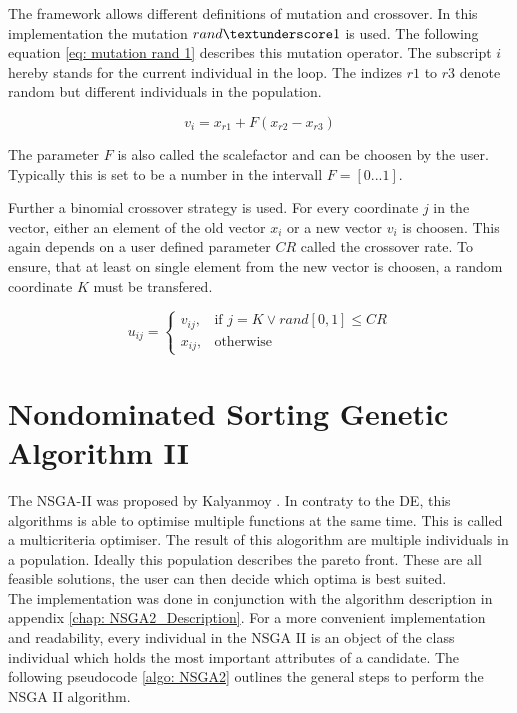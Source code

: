 \documentclass[./\jobname.tex]{subfiles}
\begin{document}
The framework allows different definitions of mutation and crossover. In this implementation the mutation $rand\textunderscore1$ is used. The following equation \ref{eq: mutation rand 1} describes this mutation operator. The subscript $i$ hereby stands for the current individual in the loop. The indizes $r1$ to $r3$ denote random but different individuals in the population. 

\begin{equation}
\label{eq: mutation rand 1}
v_i = x_{r1} + F (x_{r2} - x_{r3})
\end{equation}

The parameter $F$ is also called the scalefactor and can be choosen by the user. Typically this is set to be a number in the intervall $F = \left[ 0 ... 1 \right] $.

Further a binomial crossover strategy is used. For every coordinate $j$ in the vector, either an element of the old vector $x_i$ or a new vector $v_i$ is choosen. This again depends on a user defined parameter $CR$ called the crossover rate. To ensure, that at least on single element from the new vector is choosen, a random coordinate $K$ must be transfered. 

\begin{equation}
u_{ij}=\begin{cases}
v_{ij}, &\text{if $j = K \lor rand[0,1] \leq CR$}\\
x_{ij}, &\text{otherwise}
\end{cases}
\end{equation}

\section{Nondominated Sorting Genetic Algorithm II}
The NSGA-II was proposed by Kalyanmoy \cite{deb_fast_2002}. In contraty to the DE, this algorithms is able to optimise multiple functions at the same time. This is called a multicriteria optimiser. The result of this alogorithm are multiple individuals in a population. Ideally this population describes the pareto front. These are all feasible solutions, the user can then decide which optima is best suited. \\

The implementation was done in conjunction with the algorithm description in appendix \ref{chap: NSGA2_Description}. For a more convenient implementation and readability, every individual in the NSGA II is an object of the class individual which holds the most important attributes of a candidate. The following pseudocode \ref{algo: NSGA2} outlines the general steps to perform the NSGA II algorithm. 
\end{document}
